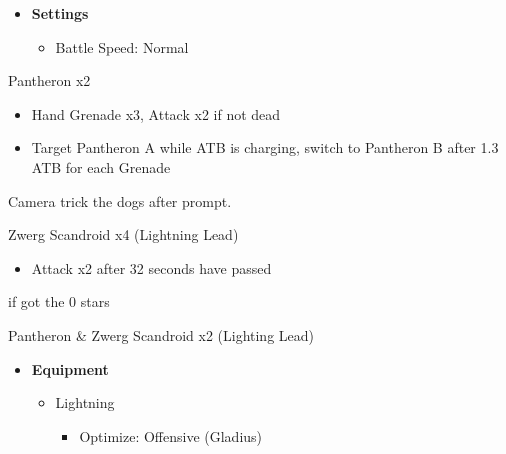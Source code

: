 	\begin{menu}
		\begin{itemize}
			\item \textbf{Settings}
			      \begin{itemize}
				      \item Battle Speed: Normal
			      \end{itemize}
		\end{itemize}
	\end{menu}

	\begin{battle}[0:16]{Pantheron x2}
		\begin{itemize}
			\item Hand Grenade x3, Attack x2 if not dead
			\item Target Pantheron A while ATB is charging, switch to Pantheron B after 1.3 ATB for each Grenade
		\end{itemize}
	\end{battle}

	Camera trick the dogs after prompt.

	\begin{battle}[0:32]{Zwerg Scandroid x4 (Lightning Lead)}
		\begin{itemize}
			\item Attack x2 after 32 seconds have passed
		\end{itemize}
		 if got the 0 stars
	\end{battle}


	\begin{battle}[0:14]{Pantheron \& Zwerg Scandroid x2 (Lighting Lead)}
	\end{battle}


	\begin{menu}
		\begin{itemize}
			\item \textbf{Equipment}
			      \begin{itemize}
				      \item Lightning
				            \begin{itemize}
					            \item Optimize: Offensive (Gladius)
				            \end{itemize}
			      \end{itemize}
		\end{itemize}
	\end{menu}


